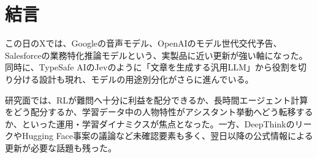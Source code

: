 \section*{結言}
この日のXでは、Googleの音声モデル、OpenAIのモデル世代交代予告、Salesforceの業務特化推論モデルという、実製品に近い更新が強い軸になった。同時に、TypeSafe AIのJevのように「文章を生成する汎用LLM」から役割を切り分ける設計も現れ、モデルの用途別分化がさらに進んでいる。

研究面では、RLが難問へ十分に利益を配分できるか、長時間エージェント計算をどう配分するか、学習データ中の人物特性がアシスタント挙動へどう転移するか、といった運用・学習ダイナミクスが焦点となった。一方、DeepThinkのリークやHugging Face事案の議論など未確認要素も多く、翌日以降の公式情報による更新が必要な話題も残った。
